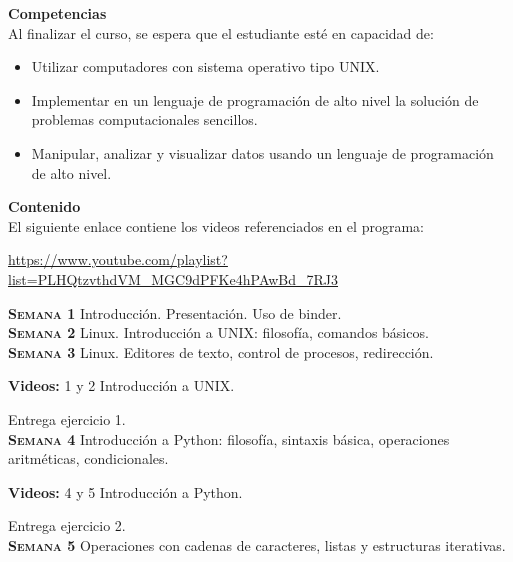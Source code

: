 \documentclass[letterpaper,10pt,onecolumn]{article}
\begin{document}
\noindent\textbf{\large {} \quad Competencias}\\[-0.2cm]

\noindent\normalsize Al finalizar el curso, se espera que el estudiante esté en capacidad de:

\begin{itemize}
	\item Utilizar computadores con sistema operativo tipo UNIX.\\[-0.6cm]
	\item Implementar en un lenguaje de programación de alto nivel la solución de problemas computacionales sencillos.\\[-0.6cm]
	\item Manipular, analizar y visualizar datos usando un lenguaje de programación de alto nivel.\\[-0.2cm]
\end{itemize}

\noindent\textbf{\large {} \quad Contenido}\\[-0.2cm]

El siguiente enlace contiene los videos referenciados en el programa:

\url{https://www.youtube.com/playlist?list=PLHQtzvthdVM_MGC9dPFKe4hPAwBd_7RJ3}

\noindent\normalsize \textbf{\textsc{Semana 1}} Introducción.
Presentación. Uso de binder.
\\[-0.3cm] 

\noindent\textbf{\textsc{Semana 2}} Linux.
Introducción a UNIX: filosofía, comandos básicos. 
\\[-0.3cm] 

\noindent\textbf{\textsc{Semana 3}}  Linux. 
Editores de texto, control de procesos, redirección.

\textbf{Videos:} 1 y 2 Introducci\'on a UNIX.

Entrega ejercicio 1.
\\[-0.3cm]  

\noindent\textbf{\textsc{Semana 4}} Introducción a Python: filosofía,
sintaxis básica, operaciones aritméticas, condicionales.

\textbf{Videos:} 4 y 5 Introducci\'on a Python.

Entrega ejercicio 2.
\\[-0.3cm]   

\noindent\textbf{\textsc{Semana 5}} Operaciones con cadenas de
caracteres, listas y estructuras iterativas.
\end{document}
